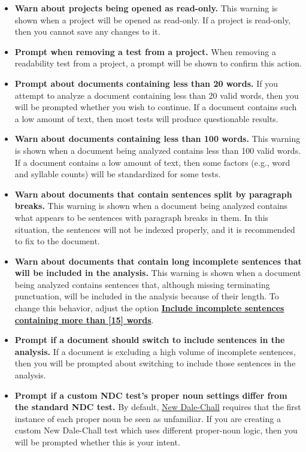 \documentclass[
]{book}
\providecommand{\tightlist}{%
  \setlength{\itemsep}{0pt}\setlength{\parskip}{0pt}}
\theoremstyle{definition}
\theoremstyle{definition}
\theoremstyle{definition}
\theoremstyle{definition}
\theoremstyle{remark}
\begin{document}
\begin{itemize}
\tightlist
\item
  \textbf{Warn about projects being opened as read-only.} This warning is shown when a project will be opened as read-only. If a project is read-only, then you cannot save any changes to it.
\item
  \textbf{Prompt when removing a test from a project.} When removing a readability test from a project, a prompt will be shown to confirm this action.
\item
  \textbf{Prompt about documents containing less than 20 words.} If you attempt to analyze a document containing less than 20 valid words, then you will be prompted whether you wish to continue. If a document contains such a low amount of text, then most tests will produce questionable results.
\item
  \textbf{Warn about documents containing less than 100 words.} This warning is shown when a document being analyzed contains less than 100 valid words. If a document contains a low amount of text, then some factors (e.g., word and syllable counts) will be standardized for some tests.
\item
  \textbf{Warn about documents that contain sentences split by paragraph breaks.} This warning is shown when a document being analyzed contains what appears to be sentences with paragraph breaks in them. In this situation, the sentences will not be indexed properly, and it is recommended to fix to the document.
\item
  \textbf{Warn about documents that contain long incomplete sentences that will be included in the analysis.} This warning is shown when a document being analyzed contains sentences that, although missing terminating punctuation, will be included in the analysis because of their length. To change this behavior, adjust the option \protect\hyperlink{options-text-exclusion}{\textbf{Include incomplete sentences containing more than {[}15{]} words}}.
\item
  \textbf{Prompt if a document should switch to include sentences in the analysis.} If a document is excluding a high volume of incomplete sentences, then you will be prompted about switching to include those sentences in the analysis.
\item
  \textbf{Prompt if a custom NDC test's proper noun settings differ from the standard NDC test.} By default, \protect\hyperlink{dale-chall-test}{New Dale-Chall} requires that the first instance of each proper noun be seen as unfamiliar. If you are creating a custom New Dale-Chall test which uses different proper-noun logic, then you will be prompted whether this is your intent.

\end{itemize}
\end{document}
